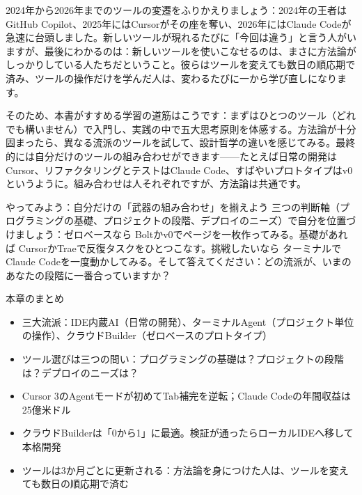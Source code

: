 2024年から2026年までのツールの変遷をふりかえりましょう：2024年の王者はGitHub Copilot、2025年にはCursorがその座を奪い、2026年にはClaude Codeが急速に台頭しました。新しいツールが現れるたびに「今回は違う」と言う人がいますが、最後にわかるのは：新しいツールを使いこなせるのは、まさに方法論がしっかりしている人たちだということ。彼らはツールを変えても数日の順応期で済み、ツールの操作だけを学んだ人は、変わるたびに一から学び直しになります。

そのため、本書がすすめる学習の道筋はこうです：まずはひとつのツール（どれでも構いません）で入門し、実践の中で五大思考原則を体感する。方法論が十分固まったら、異なる流派のツールを試して、設計哲学の違いを感じてみる。最終的には自分だけのツールの組み合わせができます——たとえば日常の開発はCursor、リファクタリングとテストはClaude Code、すばやいプロトタイプはv0というように。組み合わせは人それぞれですが、方法論は共通です。

\begin{tcbpractice}{やってみよう：自分だけの「武器の組み合わせ」を揃えよう}
三つの判断軸（プログラミングの基礎、プロジェクトの段階、デプロイのニーズ）で自分を位置づけましょう：ゼロベースなら Boltかv0でページを一枚作ってみる。基礎があれば CursorかTraeで反復タスクをひとつこなす。挑戦したいなら ターミナルでClaude Codeを一度動かしてみる。そして答えてください：どの流派が、いまのあなたの段階に一番合っていますか？

\end{tcbpractice}

\begin{tcbsummary}{本章のまとめ}
\begin{itemize}
  \item 三大流派：IDE内蔵AI（日常の開発）、ターミナルAgent（プロジェクト単位の操作）、クラウドBuilder（ゼロベースのプロトタイプ）
  \item ツール選びは三つの問い：プログラミングの基礎は？プロジェクトの段階は？デプロイのニーズは？
  \item Cursor 3のAgentモードが初めてTab補完を逆転；Claude Codeの年間収益は25億米ドル
  \item クラウドBuilderは「0から1」に最適。検証が通ったらローカルIDEへ移して本格開発
  \item ツールは3か月ごとに更新される：方法論を身につけた人は、ツールを変えても数日の順応期で済む
\end{itemize}

\end{tcbsummary}
